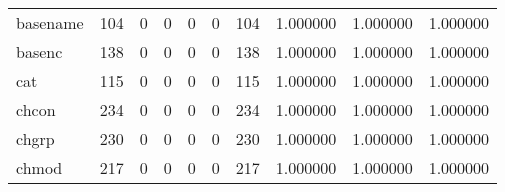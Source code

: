 \begin{tabular}{lrrrrrrrrr}
basename  &                                                104 &                                                  0 &                                                  0 &                                                  0 &                                                  0 &                                                104 &                                           1.000000 &                               1.000000 &                             1.000000 \\
basenc    &                                                138 &                                                  0 &                                                  0 &                                                  0 &                                                  0 &                                                138 &                                           1.000000 &                               1.000000 &                             1.000000 \\
cat       &                                                115 &                                                  0 &                                                  0 &                                                  0 &                                                  0 &                                                115 &                                           1.000000 &                               1.000000 &                             1.000000 \\
chcon     &                                                234 &                                                  0 &                                                  0 &                                                  0 &                                                  0 &                                                234 &                                           1.000000 &                               1.000000 &                             1.000000 \\
chgrp     &                                                230 &                                                  0 &                                                  0 &                                                  0 &                                                  0 &                                                230 &                                           1.000000 &                               1.000000 &                             1.000000 \\
chmod     &                                                217 &                                                  0 &                                                  0 &                                                  0 &                                                  0 &                                                217 &                                           1.000000 &                               1.000000 &                             1.000000 \\

\end{tabular}
